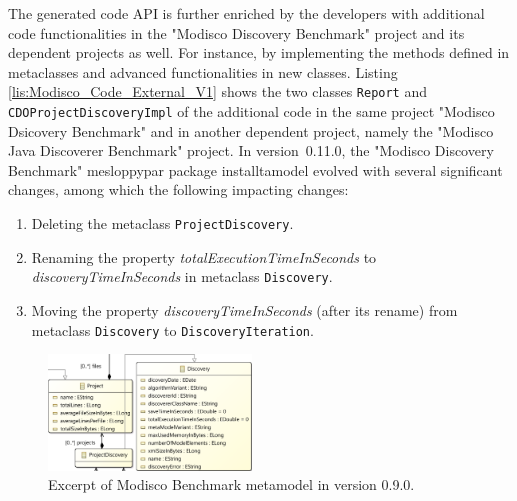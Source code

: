 The generated code API is further enriched by the developers with additional code functionalities in the "Modisco Discovery Benchmark" project and its dependent projects as well.
For instance, by implementing the methods defined in metaclasses and advanced functionalities in new classes. Listing \ref{lis:Modisco_Code_External_V1} shows the two classes \texttt{Report} and \texttt{CDOProjectDiscoveryImpl} of the additional code in the same project "Modisco Dsicovery Benchmark" and in another dependent project, namely the "Modisco Java Discoverer Benchmark" project. 
In version~0.11.0, the "Modisco Discovery Benchmark" mesloppypar package installtamodel evolved with several significant changes, among which the following impacting changes:

\begin{enumerate}%
	
	\item Deleting the metaclass \texttt{ProjectDiscovery}. 
	
	\item Renaming the property \emph{totalExecutionTimeInSeconds} to \emph{discoveryTimeInSeconds} in metaclass \texttt{Discovery}. 
	
	\item Moving the property \emph{discoveryTimeInSeconds} (after its rename) from metaclass \texttt{Discovery} to \texttt{DiscoveryIteration}. 
	
\end{enumerate} 


\begin{figure}
	
	\centering
	\includegraphics[width=0.48\textwidth]{pics/chapter1pics/example.PNG}
	\caption{Excerpt of Modisco Benchmark metamodel in version 0.9.0.}
	\label{fig: BMM}
	\vspace{-5mm}
\end{figure}

